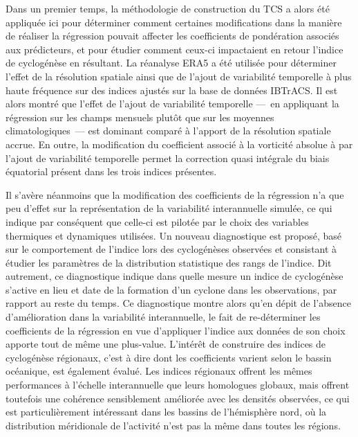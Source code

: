 \documentclass[../main.tex]{subfiles}
\begin{document}
Dans un premier temps, la méthodologie de construction du TCS a alors été appliquée ici pour déterminer comment certaines modifications dans la manière de
réaliser la régression pouvait affecter les coefficients de pondération associés aux prédicteurs, et pour étudier comment ceux-ci impactaient en retour l'indice
de cyclogénèse en résultant. La réanalyse ERA5 a été utilisée pour déterminer l'effet de la résolution spatiale ainsi que de l'ajout de variabilité temporelle à plus haute fréquence sur des indices ajustés sur la base de données IBTrACS. Il est alors montré que l'effet de l'ajout de
variabilité temporelle ---~en appliquant la régression sur les champs mensuels plutôt que sur les moyennes climatologiques~--- est dominant comparé à
l'apport de la résolution spatiale accrue. En outre, la modification du coefficient associé à la vorticité absolue à  par l'ajout de variabilité
temporelle permet la correction quasi intégrale du biais équatorial présent dans les trois indices présentes.

Il s'avère néanmoins que la modification des coefficients de la régression n'a que peu d'effet sur la représentation de la variabilité interannuelle simulée, ce
qui indique par conséquent que celle-ci est pilotée par le choix des variables thermiques et dynamiques utilisées.  Un nouveau diagnostique est proposé, basé sur le comportement de l'indice lors des cyclogénèses observées et consistant à étudier les paramètres de la distribution statistique des rangs de l'indice.
Dit autrement, ce diagnostique indique dans quelle mesure un indice de cyclogénèse s'active en lieu et date de la formation d'un cyclone dans les observations,
par rapport au reste du temps. Ce diagnostique montre alors qu'en dépit de l'absence d'amélioration dans la variabilité interannuelle, le fait de re-déterminer
les coefficients de la régression en vue d'appliquer l'indice aux données de son choix apporte tout de même une plus-value. L'intérêt de construire des indices de cyclogénèse régionaux,
c'est à dire dont les coefficients varient selon le bassin océanique, est également évalué. Les indices régionaux offrent les mêmes performances à l'échelle
interannuelle que leurs homologues globaux, mais offrent toutefois une cohérence sensiblement améliorée avec les densités observées, ce qui est particulièrement
intéressant dans les bassins de l'hémisphère nord, où la distribution méridionale de l'activité n'est pas la même dans toutes les régions.
\end{document}
